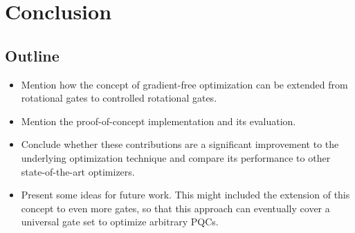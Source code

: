 \chapter{Conclusion}
\label{chap:conclusion}

\section{Outline}
\begin{itemize}
    \item
        Mention how the concept of gradient-free optimization can be
        extended from rotational gates to controlled rotational gates.
    \item
        Mention the proof-of-concept implementation and its evaluation.
    \item
        Conclude whether these contributions are a
        significant improvement to the underlying optimization technique
        and compare its performance to other state-of-the-art optimizers.
    \item
        Present some ideas for future work.
        This might included the extension of this concept to even more
        gates, so that this approach can eventually cover a universal gate
        set to optimize arbitrary PQCs.
\end{itemize}
